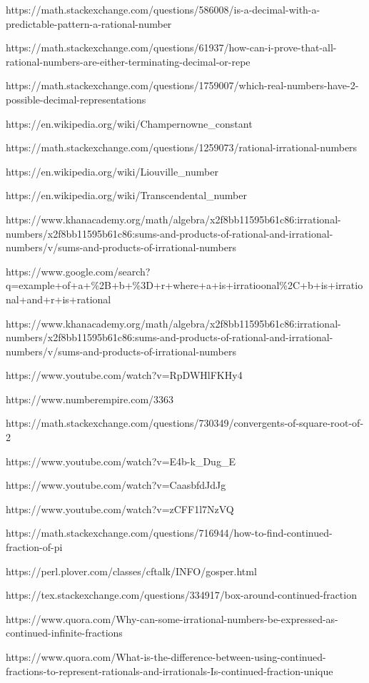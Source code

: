 \documentclass[
  a4paper,
]{article}
\begin{document}
https://math.stackexchange.com/questions/586008/is-a-decimal-with-a-predictable-pattern-a-rational-number

https://math.stackexchange.com/questions/61937/how-can-i-prove-that-all-rational-numbers-are-either-terminating-decimal-or-repe

https://math.stackexchange.com/questions/1759007/which-real-numbers-have-2-possible-decimal-representations

https://en.wikipedia.org/wiki/Champernowne\_constant

https://math.stackexchange.com/questions/1259073/rational-irrational-numbers

https://en.wikipedia.org/wiki/Liouville\_number

https://en.wikipedia.org/wiki/Transcendental\_number

https://www.khanacademy.org/math/algebra/x2f8bb11595b61c86:irrational-numbers/x2f8bb11595b61c86:sums-and-products-of-rational-and-irrational-numbers/v/sums-and-products-of-irrational-numbers

https://www.google.com/search?q=example+of+a+\%2B+b+\%3D+r+where+a+is+irratioonal\%2C+b+is+irrational+and+r+is+rational

https://www.khanacademy.org/math/algebra/x2f8bb11595b61c86:irrational-numbers/x2f8bb11595b61c86:sums-and-products-of-rational-and-irrational-numbers/v/sums-and-products-of-irrational-numbers

https://www.youtube.com/watch?v=RpDWHlFKHy4

https://www.numberempire.com/3363

https://math.stackexchange.com/questions/730349/convergents-of-square-root-of-2

https://www.youtube.com/watch?v=E4b-k\_Dug\_E

https://www.youtube.com/watch?v=CaasbfdJdJg

https://www.youtube.com/watch?v=zCFF1l7NzVQ

https://math.stackexchange.com/questions/716944/how-to-find-continued-fraction-of-pi

https://perl.plover.com/classes/cftalk/INFO/gosper.html

https://tex.stackexchange.com/questions/334917/box-around-continued-fraction

https://www.quora.com/Why-can-some-irrational-numbers-be-expressed-as-continued-infinite-fractions

https://www.quora.com/What-is-the-difference-between-using-continued-fractions-to-represent-rationals-and-irrationals-Is-continued-fraction-unique
\end{document}
